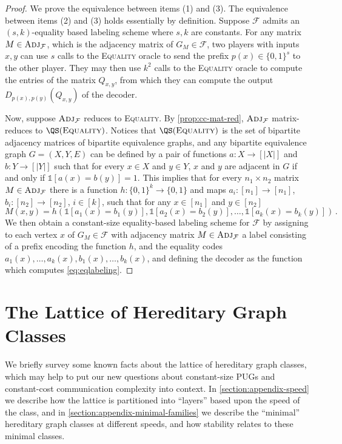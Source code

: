 \documentclass{article}
\newcommand{\ind}[1]{\mathds{1} \left[ #1 \right] }
\newcommand{\zo}{\{0,1\}}
\newcommand{\cF}{\ensuremath{\mathcal{F}}}
\newcommand{\Adj}{\textsc{Adj}}
\newcommand*\EQUALITY{\textsc{Equality}\xspace}
\begin{document}
\lemmaeqlabeling*
\begin{proof}
We prove the equivalence between items (1) and (3). The equivalence between items (2) and (3) holds
essentially by definition.  Suppose $\cF$ admits an $(s,k)$-equality based labeling scheme where
$s,k$ are constants. For any matrix $M \in \Adj_\cF$, which is the adjacency matrix of $G_M \in
\cF$, two players with inputs $x,y$ can use $s$ calls to the \EQUALITY oracle to send the prefix
$p(x) \in \zo^s$ to the other player. They may then use $k^2$ calls to the \EQUALITY oracle to
compute the entries of the matrix $Q_{x,y}$, from which they can compute the output
$D_{p(x),p(y)}(Q_{x,y})$ of the decoder.

Now, suppose $\Adj_\cF$ reduces to \EQUALITY. By \cref{prop:cc-mat-red}, $\Adj_\cF$ matrix-reduces to $\QS(\EQUALITY)$. Notices that $\QS(\EQUALITY)$ is the set of bipartite adjacency matrices of bipartite equivalence graphs, and any bipartite equivalence graph $G=(X,Y,E)$ can be defined by a pair of functions $a : X \rightarrow [|X|]$ and $b : Y \rightarrow [|Y|]$ such that for every $x \in X$ and $y \in Y$, $x$ and $y$ are adjacent in $G$ if and only if $\ind{a(x)=b(y)}=1$.
This implies that for every $n_1 \times n_2$ matrix $M \in \Adj_\cF$ there is a function $h : \zo^k \to \zo$ and maps $a_i : [n_1] \to [n_1]$, $b_i :[n_2] \to [n_2]$, $i \in [k]$, such that for any $x \in [n_1]$ and $y \in [n_2]$
\begin{equation}
	\label{eq:eqlabeling}
	M(x,y) = h(\ind{a_1(x) = b_1(y)} , \ind{a_2(x) = b_2(y)}, \dotsc, \ind{a_k(x) = b_k(y)}) \,.
\end{equation}
%
We then obtain a constant-size equality-based labeling scheme for $\cF$ by assigning to each vertex
$x$ of $G_M \in \cF$ with adjacency matrix $M \in \Adj_\cF$ a label consisting of a prefix encoding the function $h$, and the equality codes $a_1(x), \dotsc,a_k(x), b_1(x), \dotsc, b_k(x)$, and defining the decoder as the function which computes
\cref{eq:eqlabeling}.%
\end{proof}

\section{The Lattice of Hereditary Graph Classes}
\label{section:graph theory}

We briefly survey some known facts about the lattice of hereditary graph classes, which may help to
put our new questions about constant-size PUGs and constant-cost communication complexity into
context. In \cref{section:appendix-speed} we describe how the lattice is partitioned into ``layers''
based upon the speed of the class, and in \cref{section:appendix-minimal-families} we describe the
``minimal'' hereditary graph classes at different speeds, and how stability relates to these minimal
classes.
\end{document}
